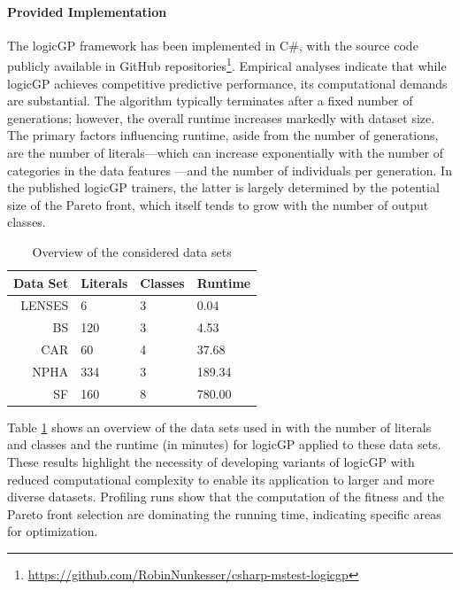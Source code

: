 \documentclass[a4paper,twoside]{article}
\begin{document}
\paragraph{Provided Implementation}

The logicGP framework has been implemented in C\#, with the source code publicly available in GitHub repositories\footnote{\url{https://github.com/RobinNunkesser/csharp-mstest-logicgp}}. Empirical analyses indicate that while logicGP achieves competitive predictive performance, its computational demands are substantial. The algorithm typically terminates after a fixed number of generations; however, the overall runtime increases markedly with dataset size. The primary factors influencing runtime, aside from the number of generations, are the number of literals—which can increase exponentially with the number of categories in the data features \citep{10.1145/3712255.3734300}—and the number of individuals per generation. In the published logicGP trainers, the latter is largely determined by the potential size of the Pareto front, which itself tends to grow with the number of output classes.

\begin{table}
\centering
\caption{Overview of the considered data sets}
\label{tab:datasets}
\begin{tabular}{rlll}
  \toprule
Data Set & Literals & Classes & Runtime \\  
\midrule
LENSES           & 6                    & 3 & 0.04          \\
BS               & 120                  & 3 & 4.53               \\
CAR              & 60                   & 4 & 37.68               \\
NPHA             & 334                  & 3 & 189.34               \\
SF               & 160                  & 8 & 780.00               \\
\bottomrule
\end{tabular}
\end{table}

Table \ref{tab:datasets} shows an overview of the data sets used in \citet{10.1145/3712255.3734300} with the number of literals and classes and the runtime (in minutes) for logicGP applied to these data sets.  
These results highlight the necessity of developing variants of logicGP with reduced computational complexity to enable its application to larger and more diverse datasets. Profiling runs show that the computation of the fitness and the Pareto front selection are dominating the running time, indicating specific areas for optimization.
\end{document}
